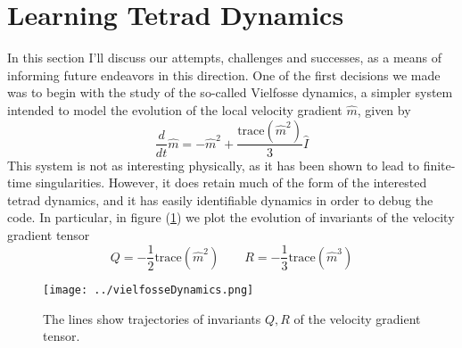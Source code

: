 \documentclass{amsart}
\newcommand{\trace}{\text{trace}}
\begin{document}
\section{Learning Tetrad Dynamics}\label{sec:learningTetrad}
In this section I'll discuss our attempts, challenges and successes, as a means of informing future endeavors in this direction. One of the first decisions we made was to begin with the study of the so-called Vielfosse dynamics\cite{cantwell1992}, a simpler system intended to model the evolution of the local velocity gradient $\hat m$, given by
\begin{equation}
  \frac{d}{dt} \hat m = -\hat m^2 + \frac{\trace(\hat m^2)}{3}\hat I
\end{equation}
This system is not as interesting physically, as it has been shown to lead to finite-time singularities. However, it does retain much of the form of the interested tetrad dynamics, and it has easily identifiable dynamics in order to debug the code. In particular, in figure (\ref{fig:vielfosseDynamics}) we plot the evolution of invariants of the velocity gradient tensor\cite{cantwell1992}
\begin{equation}
  Q = -\frac{1}{2}\trace\left(\hat m^2\right) \qquad R = -\frac{1}{3}\trace\left(\hat m^3\right)
\end{equation}

\begin{figure}%
  \centering
  \texttt{[image: ../vielfosseDynamics.png]}
  \caption{The lines show trajectories of invariants $Q,R$ of the velocity gradient tensor.}
  \label{fig:vielfosseDynamics}
\end{figure}
\end{document}
